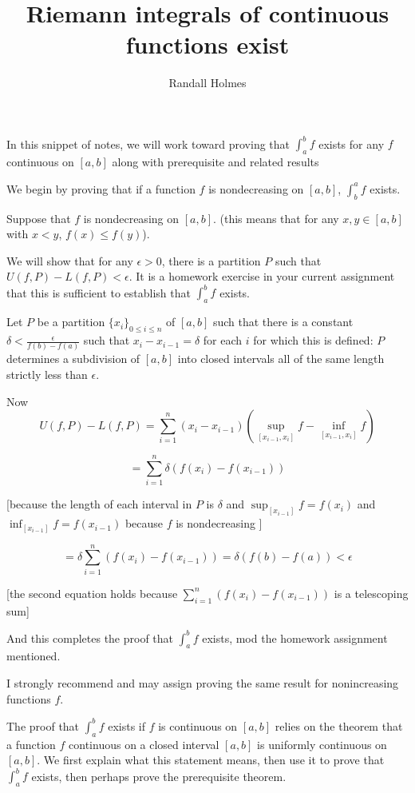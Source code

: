 \documentclass[12pt]{article}
\title{Riemann integrals of continuous functions exist}
\author{Randall Holmes}
\begin{document}
\maketitle

In this snippet of notes, we will work toward proving that $\int_a^b f$ exists for any $f$ continuous on $[a,b]$ along with prerequisite and related results

We begin by proving that if a function $f$ is nondecreasing on $[a,b]$, $\int^a_b f$ exists.

Suppose that $f$ is nondecreasing on $[a,b]$.  (this means that for any $x,y \in [a,b]$ with $x<y$, $f(x) \leq f(y)$).

We will show that for any $\epsilon > 0$, there is a partition $P$ such that $U(f,P) - L(f,P)<\epsilon$.  It is a homework exercise in your current assignment that this is sufficient to
establish that $\int_a^b f$ exists.

Let $P$ be a partition $\{x_i\}_{0 \leq i \leq n}$ of $[a,b]$ such that there is a constant $\delta <\frac{\epsilon}{f(b)-f(a)}$ such that $x_i - x_{i-1} = \delta$ for each $i$ for which this is defined:  $P$ determines a subdivision
of $[a,b]$ into closed intervals all of the same length strictly less than $\epsilon$.

Now $$U(f,P) - L(f,P) = \sum_{i=1}^n (x_i-x_{i-1})(\sup_{[x_{i-1},x_i]}f -\inf_{[x_{i-1},x_i]}f)$$

$$= \sum_{i=1}^n \delta (f(x_i) -f(x_{i-1}))$$

[because the length of each interval in $P$ is $\delta$ and $\sup_{[x_{i-1}]}f = f(x_i)$ and $\inf_{[x_{i-1}]}f = f(x_{i-1})$ because
$f$ is nondecreasing ]

$$= \delta \sum_{i=1}^n (f(x_i) -f(x_{i-1})) = \delta(f(b)-f(a)) < \epsilon$$

[the second equation holds because $\sum_{i=1}^n (f(x_i) -f(x_{i-1}))$ is a telescoping sum]

And this completes the proof that $\int_a^b f$ exists, mod the homework assignment mentioned.

I strongly recommend and may assign proving the same result for nonincreasing functions $f$.

The proof that $\int_a^b f$ exists if $f$ is continuous on $[a,b]$ relies on the theorem that a function $f$ continuous on a closed
interval $[a,b]$ is uniformly continuous on $[a,b]$.  We first explain what this statement means, then use it to prove
that $\int_a^b f$ exists, then perhaps prove the prerequisite theorem.
\end{document}
